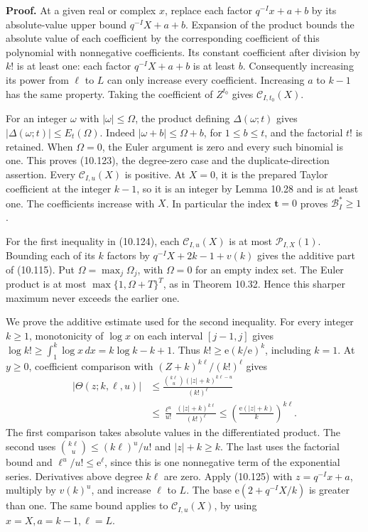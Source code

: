 \documentclass[
  11pt,
  a4paper,
]{article}
\begin{document}
\textbf{Proof.} At a given real or complex \(x\), replace each factor
\(q^{-I}x+a+b\) by its absolute-value upper bound \(q^{-I}X+a+b\).
Expansion of the product bounds the absolute value of each coefficient
by the corresponding coefficient of this polynomial with nonnegative
coefficients. Its constant coefficient after division by \(k!\) is at
least one: each factor \(q^{-I}X+a+b\) is at least \(b\). Consequently
increasing its power from \(\ell\) to \(L\) can only increase every
coefficient. Increasing \(a\) to \(k-1\) has the same property. Taking
the coefficient of \(Z^{t_0}\) gives \(\mathcal C_{I,t_0}(X)\).

For an integer \(\omega\) with \(|\omega|\le\Omega\), the product
defining \(\Delta(\omega;t)\) gives
\(|\Delta(\omega;t)|\le E_t(\Omega)\). Indeed \(|\omega+b|\le\Omega+b\),
for \(1\le b\le t\), and the factorial \(t!\) is retained. When
\(\Omega=0\), the Euler argument is zero and every such binomial is one.
This proves (10.123), the degree-zero case and the duplicate-direction
assertion. Every \(\mathcal C_{I,u}(X)\) is positive. At \(X=0\), it is
the prepared Taylor coefficient at the integer \(k-1\), so it is an
integer by Lemma 10.28 and is at least one. The coefficients increase
with \(X\). In particular the index \(\boldsymbol t=0\) proves
\(\mathcal B_I^*\ge1\).

For the first inequality in (10.124), each \(\mathcal C_{I,u}(X)\) is at
most \(\mathcal P_{I,X}(1)\). Bounding each of its \(k\) factors by
\(q^{-I}X+2k-1+v(k)\) gives the additive part of (10.115). Put
\(\Omega=\max_j\Omega_j\), with \(\Omega=0\) for an empty index set. The
Euler product is at most \(\max\{1,\Omega+T\}^T\), as in Theorem 10.32.
Hence this sharper maximum never exceeds the earlier one.

We prove the additive estimate used for the second inequality. For every
integer \(k\ge1\), monotonicity of \(\log x\) on each interval
\([j-1,j]\) gives \(\log k!\ge\int_1^k\log x\,dx=k\log k-k+1\). Thus
\(k!\ge\mathrm e(k/\mathrm e)^k\), including \(k=1\). At \(y\ge0\),
coefficient comparison with \((Z+k)^{k\ell}/(k!)^\ell\) gives \[
\begin{aligned}
|\Theta(z;k,\ell,u)|
&\le\frac{\binom{k\ell}{u}(|z|+k)^{k\ell-u}}{(k!)^\ell}\\
&\le\frac{\ell^u}{u!}\,
\frac{(|z|+k)^{k\ell}}{(k!)^\ell}
\le\left(\frac{\mathrm e(|z|+k)}k\right)^{k\ell}.
\end{aligned}
\tag{10.125}
\] The first comparison takes absolute values in the differentiated
product. The second uses \(\binom{k\ell}{u}\le(k\ell)^u/u!\) and
\(|z|+k\ge k\). The last uses the factorial bound and
\(\ell^u/u!\le\mathrm e^\ell\), since this is one nonnegative term of
the exponential series. Derivatives above degree \(k\ell\) are zero.
Apply (10.125) with \(z=q^{-I}x+a\), multiply by \(v(k)^u\), and
increase \(\ell\) to \(L\). The base \(\mathrm e(2+q^{-I}X/k)\) is
greater than one. The same bound applies to \(\mathcal C_{I,u}(X)\), by
using \(x=X,a=k-1,\ell=L\).
\end{document}
